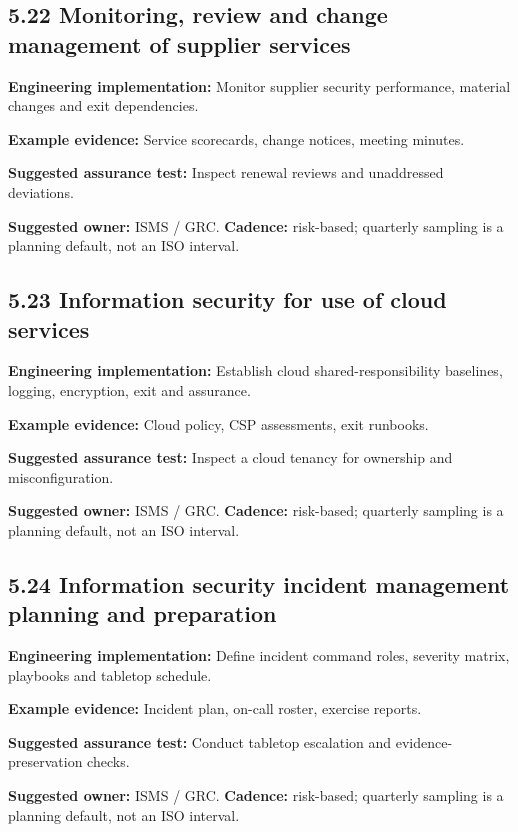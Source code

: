 \documentclass[11pt,letterpaper]{article}
\begin{document}
\subsection{5.22 Monitoring, review and change management of supplier services}
\textbf{Engineering implementation:} Monitor supplier security performance, material changes and exit dependencies.\par
\textbf{Example evidence:} Service scorecards, change notices, meeting minutes.\par
\textbf{Suggested assurance test:} Inspect renewal reviews and unaddressed deviations.\par
\textbf{Suggested owner:} ISMS / GRC. \textbf{Cadence:} risk-based; quarterly sampling is a planning default, not an ISO interval.\par
{}
\subsection{5.23 Information security for use of cloud services}
\textbf{Engineering implementation:} Establish cloud shared-responsibility baselines, logging, encryption, exit and assurance.\par
\textbf{Example evidence:} Cloud policy, CSP assessments, exit runbooks.\par
\textbf{Suggested assurance test:} Inspect a cloud tenancy for ownership and misconfiguration.\par
\textbf{Suggested owner:} ISMS / GRC. \textbf{Cadence:} risk-based; quarterly sampling is a planning default, not an ISO interval.\par
{}
\subsection{5.24 Information security incident management planning and preparation}
\textbf{Engineering implementation:} Define incident command roles, severity matrix, playbooks and tabletop schedule.\par
\textbf{Example evidence:} Incident plan, on-call roster, exercise reports.\par
\textbf{Suggested assurance test:} Conduct tabletop escalation and evidence-preservation checks.\par
\textbf{Suggested owner:} ISMS / GRC. \textbf{Cadence:} risk-based; quarterly sampling is a planning default, not an ISO interval.\par
{}
\end{document}
